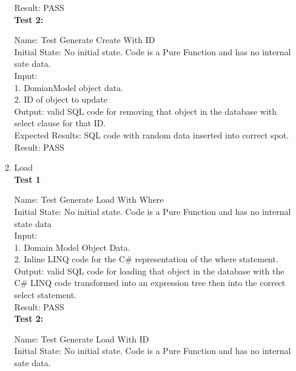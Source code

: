 \documentclass[12pt, titlepage]{article}
\begin{document}
\begin{enumerate}
\begin{enumerate}
				Result: PASS\\

				{\bf Test 2:\\}

				Name: Test Generate Create With ID\\

				Initial State: No initial state. Code is a Pure Function and has no internal sate data.\\

				Input:\\
				1. DomianModel object data.\\
				2. ID of object to update\\

				Output: valid SQL code for removing that object in the database with
				select clause for that ID.\\

				Expected Results: SQL code with random data inserted into correct spot.\\

				Result: PASS\\

				\item Load\\

				{\bf Test 1\\}

				Name: Test Generate Load With Where\\

				Initial State: No initial state. Code is a Pure Function and has no internal state data\\

				Input:\\
				1. Domain Model Object Data.\\
				2. Inline LINQ code for the C\# representation of the where statement.\\

				Output: valid SQL code for loading that object in the database
				with the C\# LINQ code transformed into an expression tree then into the
				correct select statement.\\

				Result: PASS\\

				{\bf Test 2:\\}

				Name: Test Generate Load With ID\\

				Initial State: No initial state. Code is a Pure Function and has no internal sate data.\\


\end{enumerate}
\end{enumerate}
\end{document}
